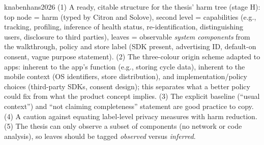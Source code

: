 \begin{papercard}{knabenhans2026}
 (1) A ready, citable structure for the thesis' harm tree (stage H): top node = harm (typed by Citron and Solove), second level = capabilities (e.g., tracking, profiling, inference of health status, re-identification, distinguishing users, disclosure to third parties), leaves = observable \emph{system components} from the walkthrough, policy and store label (SDK present, advertising ID, default-on consent, vague purpose statement). (2) The three-colour origin scheme adapted to apps: inherent to the app's function (e.g., storing cycle data), inherent to the mobile context (OS identifiers, store distribution), and implementation/policy choices (third-party SDKs, consent design); this separates what a better policy could fix from what the product concept implies. (3) The explicit baseline (``usual context'') and ``not claiming completeness'' statement are good practice to copy. (4) A caution against equating label-level privacy measures with harm reduction. (5) The thesis can only observe a subset of components (no network or code analysis), so leaves should be tagged \emph{observed} versus \emph{inferred}.
\end{papercard}
